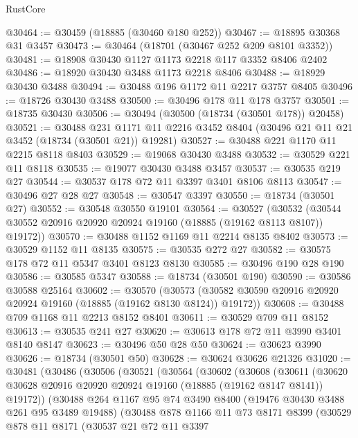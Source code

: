 \begin{lexlean}{RustCore}
\begin{coremodule}
@30464 := @30459 (@18885 (@30460 @180 @252))
@30467 := @18895 @30368 @31 @3457
@30473 := @30464 (@18701 (@30467 @252 @209 @8101 @3352))
@30481 := @18908 @30430 @1127 @1173 @2218 @117 @3352 @8406 @2402
@30486 := @18920 @30430 @3488 @1173 @2218 @8406
@30488 := @18929 @30430 @3488
@30494 := @30488 @196 @1172 @11 @2217 @3757 @8405
@30496 := @18726 @30430 @3488
@30500 := @30496 @178 @11 @178 @3757
@30501 := @18735 @30430
@30506 := @30494 (@30500 (@18734 (@30501 @178)) @20458)
@30521 := @30488
    @231
    @1171
    @11
    @2216
    @3452
    @8404
    (@30496 @21 @11 @21 @3452 (@18734 (@30501 @21)) @19281)
@30527 := @30488 @221 @1170 @11 @2215 @8118 @8403
@30529 := @19068 @30430 @3488
@30532 := @30529 @221 @11 @8118
@30535 := @19077 @30430 @3488 @3457
@30537 := @30535 @219 @27
@30544 := @30537 @178 @72 @11 @3397 @3401 @8106 @8113
@30547 := @30496 @27 @28 @27
@30548 := @30547 @3397
@30550 := @18734 (@30501 @27)
@30552 := @30548 @30550 @19101
@30564 := @30527
    (@30532 (@30544 @30552 @20916 @20920 @20924 @19160 (@18885 (@19162 @8113 @8107)) @19172))
@30570 := @30488 @1152 @1169 @11 @2214 @8135 @8402
@30573 := @30529 @1152 @11 @8135
@30575 := @30535 @272 @27
@30582 := @30575 @178 @72 @11 @5347 @3401 @8123 @8130
@30585 := @30496 @190 @28 @190
@30586 := @30585 @5347
@30588 := @18734 (@30501 @190)
@30590 := @30586 @30588 @25164
@30602 := @30570
    (@30573 (@30582 @30590 @20916 @20920 @20924 @19160 (@18885 (@19162 @8130 @8124)) @19172))
@30608 := @30488 @709 @1168 @11 @2213 @8152 @8401
@30611 := @30529 @709 @11 @8152
@30613 := @30535 @241 @27
@30620 := @30613 @178 @72 @11 @3990 @3401 @8140 @8147
@30623 := @30496 @50 @28 @50
@30624 := @30623 @3990
@30626 := @18734 (@30501 @50)
@30628 := @30624 @30626 @21326
@31020 := @30481
    (@30486
      (@30506
        (@30521
          (@30564
            (@30602
              (@30608
                (@30611
                  (@30620 @30628 @20916 @20920 @20924 @19160 (@18885 (@19162 @8147 @8141)) @19172))
                (@30488
                  @264
                  @1167
                  @95
                  @74
                  @3490
                  @8400
                  (@19476 @30430 @3488 @261 @95 @3489 @19488)
                  (@30488
                    @878
                    @1166
                    @11
                    @73
                    @8171
                    @8399
                    (@30529
                      @878
                      @11
                      @8171
                      (@30537
                        @21
                        @72
                        @11
                        @3397

\end{coremodule}
\end{lexlean}
